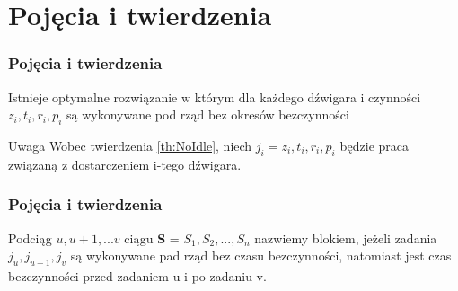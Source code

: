 \documentclass{beamer}
\begin{document}


\section{Pojęcia i twierdzenia}

\begin{frame}

\frametitle{Pojęcia i twierdzenia}
  
 \begin{theorem}\label{th:NoIdle}
  Istnieje optymalne rozwiązanie w którym dla każdego dźwigara i czynności $z_i, t_i, r_i, p_i$ są wykonywane
  pod rząd bez okresów bezczynności
 \end{theorem}
 
 \begin{block}{Uwaga}
  Wobec twierdzenia \ref{th:NoIdle}, niech $j_i = z_i, t_i, r_i, p_i$ będzie praca związaną z dostarczeniem i-tego dźwigara.
 \end{block}

\end{frame}
 



\begin{frame}
\frametitle{Pojęcia i twierdzenia}
  
 \begin{definition}\label{de:block}
  Podciąg $ u, u+1, ... v$ ciągu \textbf{S} = $S_1, S_2,...,S_n $ nazwiemy \alert{blokiem}, jeżeli zadania $j_u, j_{u+1}, j_v $
  są wykonywane pad rząd bez czasu bezczynności, natomiast jest czas bezczynności przed zadaniem u i po zadaniu v.
 \end{definition}
 
 
\end{frame}


\end{document}
